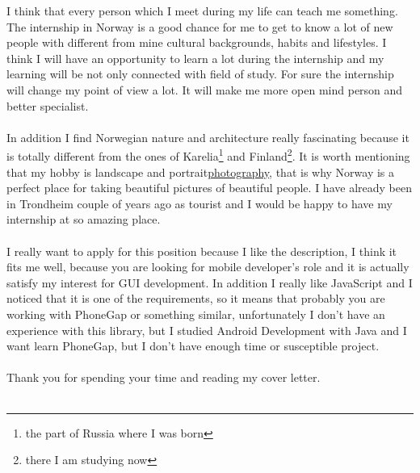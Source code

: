 \documentclass[english]{article}
\begin{document}
I think that every person which I meet during my life can teach me something. The internship in Norway is a good chance for me to get to know a lot of new people with different from mine cultural backgrounds, habits and lifestyles. I think I will have an opportunity to learn a lot during the internship and my learning will be not only connected with field of study. For sure the internship will change my point of view a lot. It will make me more open mind person and better specialist.\\\\
In addition I find Norwegian nature and architecture really fascinating because it is totally different from the ones of Karelia\footnote{the part of Russia where I was born} and Finland\footnote{there I am studying now}. It is worth mentioning that my hobby is landscape and portrait\href{https://www.facebook.com/airtucha/media_set?set=a.1404921599747323.1073741829.100006884891507&type=3}{photography}, that is why Norway is a perfect place for taking beautiful pictures of beautiful people. I have already been in Trondheim couple of years ago as tourist and I would be happy to have my internship at so amazing place.\\\\
I really want to apply for this position because I like the description, I think it fits me well, because you are looking for mobile developer's role and it is actually satisfy my interest for GUI development. In addition I really like JavaScript and I noticed that it is one of the requirements, so it means that probably you are working with PhoneGap or something similar, unfortunately I don't have an experience with this library, but I studied Android Development with Java and I want learn PhoneGap, but I don't have enough time or susceptible project.\\\\
Thank you for spending your time and reading my cover letter.\\\\


\begin{flushright}

     

\end{flushright}
\end{document}
